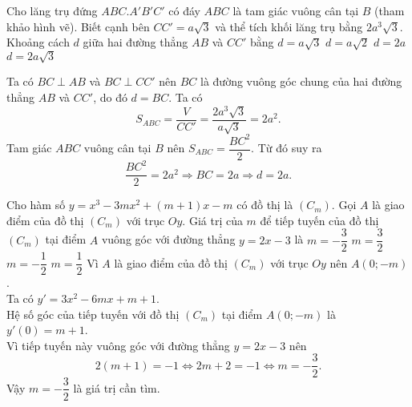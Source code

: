 \begin{ex}%
 \immini
 {
 Cho lăng trụ đứng $ABC.A'B'C'$ có đáy $ABC$ là tam giác vuông cân tại $B$ (tham khảo hình vẽ). Biết cạnh bên $CC'=a\sqrt{3}$ và thể tích khối lăng trụ bằng $2a^3\sqrt{3}$. Khoảng cách $d$ giữa hai đường thẳng $AB$ và $CC'$ bằng
 \choice
  {$d=a\sqrt{3}$}
  {$d=a\sqrt{2}$}
  {\True $d=2a$}
  {$d=2a\sqrt{3}$}
 }
 {
 }
 \loigiai
  {
  \immini
  {
  Ta có $BC\perp AB$ và $BC\perp CC'$ nên $BC$ là đường vuông góc chung của hai đường thẳng $AB$ và $CC'$, do đó $d=BC$. Ta có
  \[S_{ABC}=\dfrac{V}{CC'}=\dfrac{2a^3\sqrt{3}}{a\sqrt{3}}=2a^2.\]
  Tam giác $ABC$ vuông cân tại $B$ nên $S_{ABC}=\dfrac{BC^2}{2}$. Từ đó suy ra
  \[\dfrac{BC^2}{2}=2a^2\Rightarrow BC=2a\Rightarrow d=2a.\]
  }
  {
  }
  }
\end{ex}

\begin{ex}%
 Cho hàm số $y=x^3-3mx^2+(m+1)x-m$ có đồ thị là $(C_m)$. Gọi $A$ là giao điểm của đồ thị $(C_m)$ với trục $Oy$. Giá trị của $m$ để tiếp tuyến của đồ thị $(C_m)$ tại điểm $A$ vuông góc với đường thẳng $y=2x-3$ là
 \choice
  {\True $m=-\dfrac{3}{2}$}
  {$m=\dfrac{3}{2}$}
  {$m=-\dfrac{1}{2}$}
  {$m=\dfrac{1}{2}$}
 \loigiai
  {
  Vì $A$ là giao điểm của đồ thị $(C_m)$ với trục $Oy$ nên $A(0;-m)$.\\
  Ta có $y'=3x^2-6mx+m+1$.\\
  Hệ số góc của tiếp tuyến với đồ thị $(C_m)$ tại điểm $A(0;-m)$ là $y'(0)=m+1$.\\
  Vì tiếp tuyến này vuông góc với đường thẳng $y=2x-3$ nên
  \[2(m+1)=-1 \Leftrightarrow 2m+2=-1 \Leftrightarrow m=-\dfrac{3}{2}.\]
  Vậy $m=-\dfrac{3}{2}$ là giá trị cần tìm.
  }
\end{ex}

